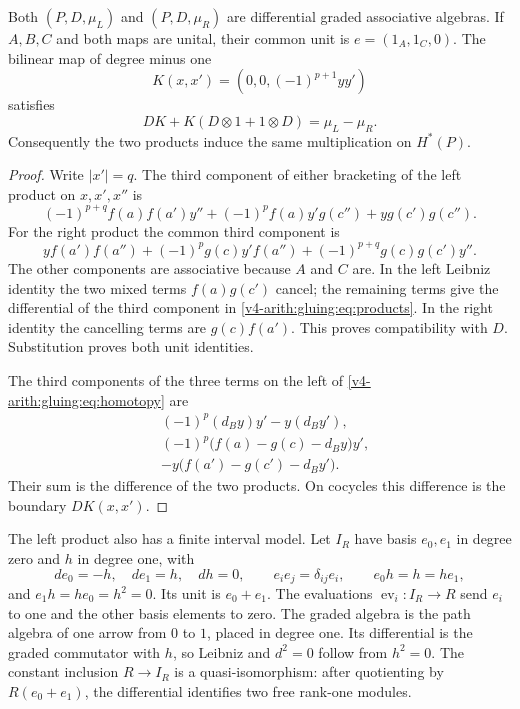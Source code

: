 \begin{proposition}\label{v4-arith:gluing:prop:products}
Both \((P,D,\mu_L)\) and \((P,D,\mu_R)\) are differential graded
associative algebras. If \(A,B,C\) and both maps are unital, their common
unit is \(e=(1_A,1_C,0)\). The bilinear map of degree minus one
\[
 K(x,x')=(0,0,(-1)^{p+1}yy')
\]
satisfies
\begin{equation}\label{v4-arith:gluing:eq:homotopy}
 DK+K(D\otimes1+1\otimes D)=\mu_L-\mu_R.
\end{equation}
Consequently the two products induce the same multiplication on
\(H^*(P)\).
\end{proposition}

\begin{proof}
Write \(|x'|=q\). The third component of either bracketing of the left
product on \(x,x',x''\) is
\[
 (-1)^{p+q}f(a)f(a')y''
 +(-1)^pf(a)y'g(c'')+yg(c')g(c'').
\]
For the right product the common third component is
\[
 yf(a')f(a'')+(-1)^pg(c)y'f(a'')
                 +(-1)^{p+q}g(c)g(c')y''.
\]
The other components are associative because \(A\) and \(C\) are.
In the left Leibniz identity the two mixed terms \(f(a)g(c')\)
cancel; the remaining terms give the differential of the third
component in \eqref{v4-arith:gluing:eq:products}. In the right identity
the cancelling terms are \(g(c)f(a')\). This proves compatibility with
\(D\). Substitution proves both unit identities.

The third components of the three terms on the left of
\eqref{v4-arith:gluing:eq:homotopy} are
\[
 \begin{split}
 &(-1)^p(d_By)y'-y(d_By'),\\
 &(-1)^p\bigl(f(a)-g(c)-d_By\bigr)y',\\
 &-y\bigl(f(a')-g(c')-d_By'\bigr).
 \end{split}
\]
Their sum is the difference of the two products. On cocycles this
difference is the boundary \(DK(x,x')\).
\end{proof}

The left product also has a finite interval model. Let \(I_R\) have
basis \(e_0,e_1\) in degree zero and \(h\) in degree one, with
\[
 de_0=-h,\quad de_1=h,\quad dh=0,
 \qquad e_ie_j=\delta_{ij}e_i,
 \qquad e_0h=h=he_1,
\]
and \(e_1h=he_0=h^2=0\). Its unit is \(e_0+e_1\). The evaluations
\(\operatorname{ev}_i:I_R\to R\) send \(e_i\) to one and the other
basis elements to zero. The graded algebra is the path algebra of one
arrow from \(0\) to \(1\), placed in degree one. Its differential is
the graded commutator with \(h\), so Leibniz and \(d^2=0\) follow
from \(h^2=0\). The constant inclusion \(R\to I_R\)
is a quasi-isomorphism: after quotienting by \(R(e_0+e_1)\), the
differential identifies two free rank-one modules.

